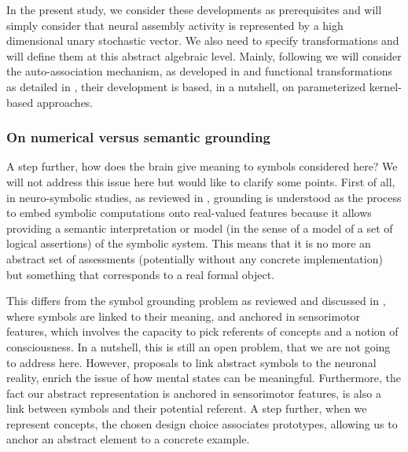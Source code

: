 \documentclass[sn-mathphys]{sn-jnl}
\begin{document}
In the present study, we consider these developments as prerequisites and will simply consider that neural assembly activity is represented by a high dimensional unary stochastic vector. We also need to specify transformations and will define them at this abstract algebraic level. Mainly, following \cite{mercier_ontology_2021} we will consider the auto-association mechanism, as developed in \cite{stewart_biologically_2011} and functional transformations as detailed in \cite{eliasmith_neural_2002}, their development is based, in a nutshell, on parameterized kernel-based approaches.

\subsubsection{On numerical versus semantic grounding}

A step further, how does the brain give meaning to symbols considered here? We will not address this issue here but would like to clarify some points. First of all, in neuro-symbolic studies, as reviewed in \cite{garcez_neurosymbolic_2020}, grounding is understood as the process to embed symbolic computations onto real-valued features \cite{badreddine_logic_2021} because it allows providing a semantic interpretation or model (in the sense of a model of a set of logical assertions) of the symbolic system. This means that it is no more an abstract set of assessments (potentially without any concrete implementation) but something that corresponds to a real formal object.

This differs from the symbol grounding problem as reviewed and discussed in \cite{taddeo_solving_2005}, where symbols are linked to their meaning, and anchored in sensorimotor features, which involves the capacity to pick referents of concepts and a notion of consciousness. In a nutshell, this is still an open problem, that we are not going to address here. However, proposals to link abstract symbols to the neuronal reality, enrich the issue of how mental states can be meaningful. Furthermore, the fact our abstract representation is anchored in sensorimotor features, is also a link between symbols and their potential referent. A step further, when we represent concepts, the chosen design choice associates prototypes, allowing us to anchor an abstract element to a concrete example.
\end{document}
